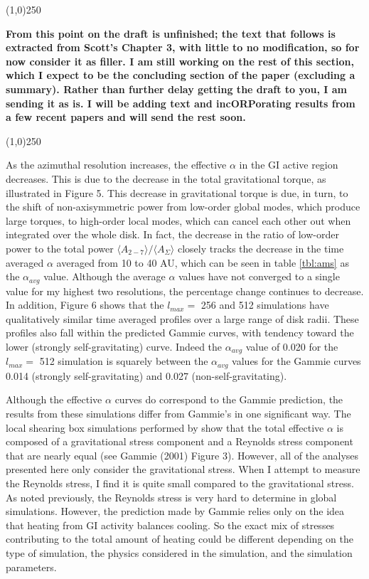 \documentclass[manuscript]{aastex} %
\begin{document}
\begin{center}
\line(1,0){250}
\end{center}

{\bf From this point on the draft is unfinished; the text that follows is extracted from 
Scott's Chapter 3, with little to no modification, so for now consider it as filler.   
I am still working on the rest of this section, which I expect to be the concluding section
of the paper (excluding a summary).  Rather than further delay getting
the draft to you, I am sending it as is.   I will be adding text and incORPorating results from a 
few recent papers and will send the rest soon.}

\begin{center}
\line(1,0){250}
\end{center}


As the azimuthal resolution increases, the effective $\alpha$ in the GI active region decreases. This is due to the decrease in the total gravitational torque, as illustrated in Figure 5. This decrease in gravitational torque is due, in turn, to the shift of non-axisymmetric power from low-order global modes, which produce large torques, to high-order local modes, which can cancel each other out when integrated over the whole disk. In fact, the decrease in the ratio of low-order power to the total power $\langle A_{2-7}\rangle / \langle A_\Sigma \rangle$ closely tracks the decrease in the time averaged $\alpha$ averaged from 10 to 40 AU, which can be seen in table \ref{tbl:ams} as the $\alpha_{avg}$ value. Although the average $\alpha$ values have not converged to a single value for my highest two resolutions, the percentage change continues to decrease. In addition, Figure 6 shows that the $l_{max} =$ 256
and 512 simulations have qualitatively similar time averaged profiles over a large range of disk radii. These profiles also fall within the predicted Gammie curves, with tendency toward the lower (strongly self-gravitating) curve. Indeed the $\alpha_{avg}$ value of 0.020 for the $l_{max} = $ 512 simulation is squarely between the $\alpha_{avg}$ values for the Gammie curves 0.014 (strongly self-gravitating) and 0.027 (non-self-gravitating).

Although the effective $\alpha$ curves do correspond to the Gammie prediction, the results from these simulations differ from Gammie's in one significant way. The local shearing box simulations performed by \citet{gammie2001} show that the total effective $\alpha$ is composed of a gravitational stress component and a Reynolds stress component that are nearly equal (see Gammie (2001) Figure 3). However, all of the analyses
presented here only consider the gravitational stress. When I attempt to measure
the Reynolds stress, I find it is quite small compared to the gravitational stress. As
noted previously, the Reynolds stress is very hard to determine in global simulations.
However, the prediction made by Gammie relies only on the idea that heating from
GI activity balances cooling. So the exact mix of stresses contributing to the total
amount of heating could be different depending on the type of simulation, the physics
considered in the simulation, and the simulation parameters.
\end{document}
